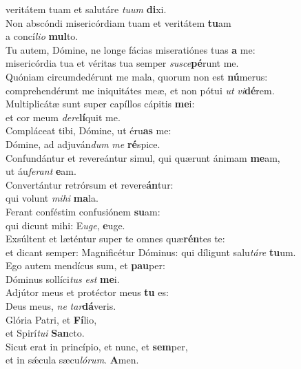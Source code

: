 \oddverse veritátem tuam et salutáre \textit{tu}\textit{um} \textbf{di}xi.\\
\evenverse Non abscóndi misericórdiam tuam et veritátem \textbf{tu}am~\*\\
\evenverse a concí\textit{li}\textit{o} \textbf{mul}to.\\
\oddverse Tu autem, Dómine, ne longe fácias miseratiónes tuas \textbf{a} me:~\*\\
\oddverse misericórdia tua et véritas tua semper \textit{su}\textit{sce}\textbf{pé}runt me.\\
\evenverse Quóniam circumdedérunt me mala, quorum non est \textbf{nú}merus:~\*\\
\evenverse comprehendérunt me iniquitátes meæ, et non pótui \textit{ut} \textit{vi}\textbf{dé}rem.\\
\oddverse Multiplicátæ sunt super capíllos cápitis \textbf{me}i:~\*\\
\oddverse et cor meum \textit{de}\textit{re}\textbf{lí}quit me.\\
\evenverse Compláceat tibi, Dómine, ut éru\textbf{as} me:~\*\\
\evenverse Dómine, ad adjuván\textit{dum} \textit{me} \textbf{ré}spice.\\
\oddverse Confundántur et revereántur simul, qui quærunt ánimam \textbf{me}am,~\*\\
\oddverse ut áu\textit{fe}\textit{rant} \textbf{e}am.\\
\evenverse Convertántur retrórsum et revere\textbf{án}tur:~\*\\
\evenverse qui volunt \textit{mi}\textit{hi} \textbf{ma}la.\\
\oddverse Ferant conféstim confusiónem \textbf{su}am:~\*\\
\oddverse qui dicunt mihi: E\textit{u}\textit{ge}, \textbf{e}uge.\\
\evenverse Exsúltent et læténtur super te omnes quæ\textbf{rén}tes te:~\*\\
\evenverse et dicant semper: Magnificétur Dóminus: qui díligunt salu\textit{tá}\textit{re} \textbf{tu}um.\\
\oddverse Ego autem mendícus sum, et \textbf{pau}per:~\*\\
\oddverse Dóminus sollíci\textit{tus} \textit{est} \textbf{me}i.\\
\evenverse Adjútor meus et protéctor meus \textbf{tu} es:~\*\\
\evenverse Deus meus, \textit{ne} \textit{tar}\textbf{dá}veris.\\
\oddverse Glória Patri, et \textbf{Fí}lio,~\*\\
\oddverse et Spirí\textit{tu}\textit{i} \textbf{San}cto.\\
\evenverse Sicut erat in princípio, et nunc, et \textbf{sem}per,~\*\\
\evenverse et in sǽcula sæcu\textit{ló}\textit{rum}. \textbf{A}men.\\
